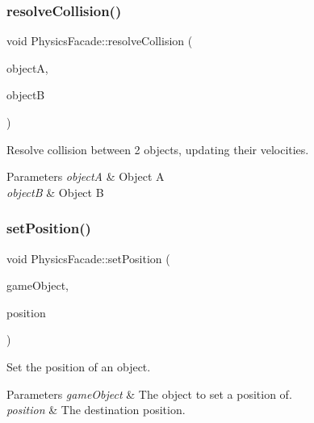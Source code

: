 \subsubsection{\texorpdfstring{resolve\+Collision()}{resolveCollision()}}
{\footnotesize\ttfamily void Physics\+Facade\+::resolve\+Collision (\begin{DoxyParamCaption}\item[{shared\+\_\+ptr$<$ \mbox{\hyperlink{class_game_object}{Game\+Object}} $>$}]{objectA,  }\item[{shared\+\_\+ptr$<$ \mbox{\hyperlink{class_game_object}{Game\+Object}} $>$}]{objectB }\end{DoxyParamCaption})}



Resolve collision between 2 objects, updating their velocities. 


\begin{DoxyParams}{Parameters}
{\em objectA} & Object A\\
\hline
{\em objectB} & Object B\\
\hline
\end{DoxyParams}
\mbox{\label{class_physics_facade_a1a74ada6cb5fd3cac339165dbc506b8d}} 
\subsubsection{\texorpdfstring{set\+Position()}{setPosition()}}
{\footnotesize\ttfamily void Physics\+Facade\+::set\+Position (\begin{DoxyParamCaption}\item[{shared\+\_\+ptr$<$ \mbox{\hyperlink{class_game_object}{Game\+Object}} $>$}]{game\+Object,  }\item[{\mbox{\hyperlink{struct_vec2}{Vec2}}}]{position }\end{DoxyParamCaption})}



Set the position of an object. 


\begin{DoxyParams}{Parameters}
{\em game\+Object} & The object to set a position of.\\
\hline
{\em position} & The destination position.\\
\hline
\end{DoxyParams}
\mbox{\label{class_physics_facade_aabef1158811a4aae1bc786c7269ce794}} 
